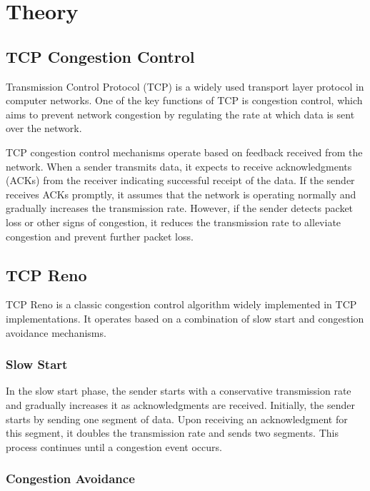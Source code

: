 \documentclass[11pt]{article}
\begin{document}
\section{Theory}

\subsection{TCP Congestion Control}

Transmission Control Protocol (TCP) is a widely used transport layer protocol in computer networks. One of the key functions of TCP is congestion control, which aims to prevent network congestion by regulating the rate at which data is sent over the network.

TCP congestion control mechanisms operate based on feedback received from the network. When a sender transmits data, it expects to receive acknowledgments (ACKs) from the receiver indicating successful receipt of the data. If the sender receives ACKs promptly, it assumes that the network is operating normally and gradually increases the transmission rate. However, if the sender detects packet loss or other signs of congestion, it reduces the transmission rate to alleviate congestion and prevent further packet loss.

\subsection{TCP Reno}

TCP Reno is a classic congestion control algorithm widely implemented in TCP implementations. It operates based on a combination of slow start and congestion avoidance mechanisms.

\subsubsection{Slow Start}

In the slow start phase, the sender starts with a conservative transmission rate and gradually increases it as acknowledgments are received. Initially, the sender starts by sending one segment of data. Upon receiving an acknowledgment for this segment, it doubles the transmission rate and sends two segments. This process continues until a congestion event occurs.

\subsubsection{Congestion Avoidance}
\end{document}

